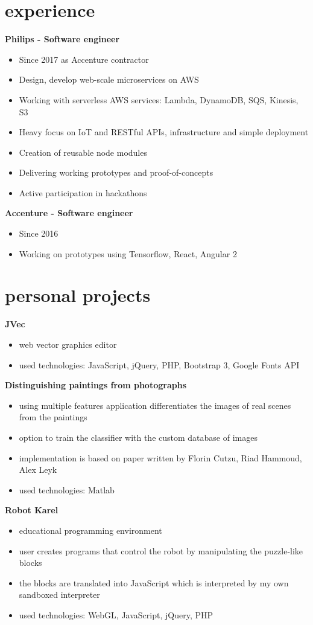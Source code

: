 \documentclass[]{friggeri-cv}
\begin{document}
\section{experience}

\textbf{Philips - Software engineer}
\begin{itemize}
    \item Since 2017 as Accenture contractor
    \item Design, develop web-scale microservices on AWS
    \item Working with serverless AWS services: Lambda, DynamoDB, SQS, Kinesis, S3
	\item Heavy focus on IoT and RESTful APIs, infrastructure and simple deployment
    \item Creation of reusable node modules
    \item Delivering working prototypes and proof-of-concepts
    \item Active participation in hackathons
\end{itemize}

\textbf{Accenture - Software engineer}
\begin{itemize}
    \item Since 2016
    \item Working on prototypes using Tensorflow, React, Angular 2
\end{itemize}

\section{personal projects}

\textbf{JVec}
\begin{itemize}
    \item web vector graphics editor
    \item used technologies: JavaScript, jQuery, PHP, Bootstrap 3, Google Fonts API
\end{itemize}

\textbf{Distinguishing paintings from photographs}
\begin{itemize}
    \item using multiple features application differentiates the images of real scenes from the paintings
    \item option to train the classifier with the custom database of images
    \item implementation is based on paper written by Florin Cutzu, Riad Hammoud, Alex Leyk
    \item used technologies: Matlab
\end{itemize}

\textbf{Robot Karel}
\begin{itemize}
	\item educational programming environment
	\item user creates programs that control the robot by manipulating the puzzle-like blocks
	\item the blocks are translated into JavaScript which is interpreted by my own sandboxed interpreter
	\item used technologies: WebGL, JavaScript, jQuery, PHP
\end{itemize}
\end{document}
